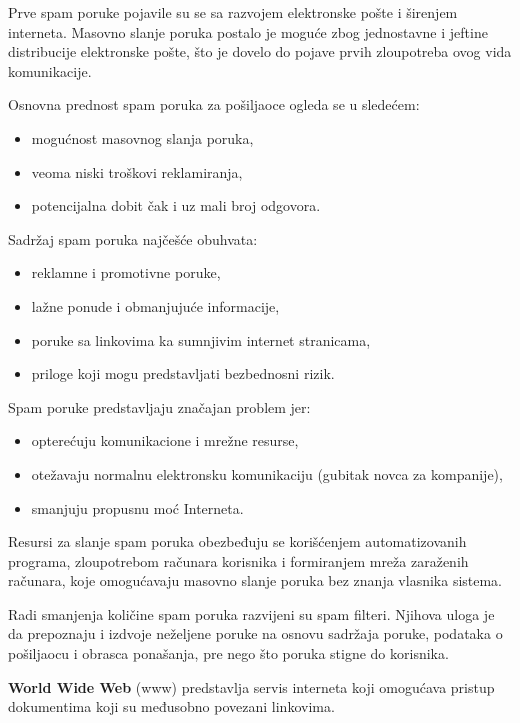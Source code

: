 \documentclass[a4paper, 12pt]{article}
\begin{document}
Prve spam poruke pojavile su se sa razvojem elektronske pošte i širenjem interneta.
Masovno slanje poruka postalo je moguće zbog jednostavne i jeftine distribucije
elektronske pošte, što je dovelo do pojave prvih zloupotreba ovog vida komunikacije.

Osnovna prednost spam poruka za pošiljaoce ogleda se u sledećem:
\begin{itemize}
    \item mogućnost masovnog slanja poruka,
    \item veoma niski troškovi reklamiranja,
    \item potencijalna dobit čak i uz mali broj odgovora.
\end{itemize}

Sadržaj spam poruka najčešće obuhvata:
\begin{itemize}
    \item reklamne i promotivne poruke,
    \item lažne ponude i obmanjujuće informacije,
    \item poruke sa linkovima ka sumnjivim internet stranicama,
    \item priloge koji mogu predstavljati bezbednosni rizik.
\end{itemize}

Spam poruke predstavljaju značajan problem jer:
\begin{itemize}
    \item opterećuju komunikacione i mrežne resurse,
    \item otežavaju normalnu elektronsku komunikaciju (gubitak novca za kompanije),
    \item smanjuju propusnu moć Interneta.
\end{itemize}

Resursi za slanje spam poruka obezbeđuju se korišćenjem automatizovanih programa,
zloupotrebom računara korisnika i formiranjem mreža zaraženih računara, koje
omogućavaju masovno slanje poruka bez znanja vlasnika sistema.

Radi smanjenja količine spam poruka razvijeni su spam filteri. Njihova uloga je da
prepoznaju i izdvoje neželjene poruke na osnovu sadržaja poruke, podataka o
pošiljaocu i obrasca ponašanja, pre nego što poruka stigne do korisnika.

\vspace{\baselineskip}

\textbf{World Wide Web} (www) predstavlja servis interneta koji omogućava pristup dokumentima koji su međusobno povezani linkovima. 
\end{document}
